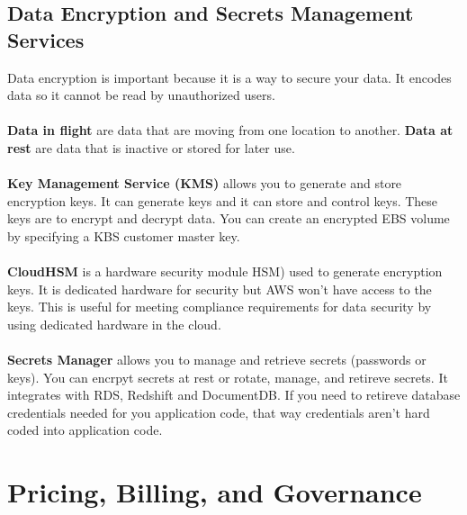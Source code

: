 \documentclass{article}%
\begin{document}
\subsection{Data Encryption and Secrets Management Services}
Data encryption is important because it is a way to secure your data. It encodes data so it cannot be read by unauthorized users. \\ \\
\textbf{Data in flight} are data that are moving from one location to another. 
\textbf{Data at rest} are data that is inactive or stored for later use. \\ \\
\textbf{Key Management Service (KMS)} allows you to generate and store encryption keys. It can generate keys and it can store and control keys. These keys are to encrypt and decrypt data. You can create an encrypted EBS volume by specifying a KBS customer master key. \\ \\
\textbf{CloudHSM} is a hardware security module HSM) used to generate encryption keys. It is dedicated hardware for security but AWS won't have access to the keys. This is useful for meeting compliance requirements for data security by using dedicated hardware in the cloud. \\ \\
\textbf{Secrets Manager} allows you to manage and retrieve secrets (passwords or keys). You can encrpyt secrets at rest or rotate, manage, and retireve secrets. It integrates with RDS, Redshift and DocumentDB. If you need to retireve database credentials needed for you application code, that way credentials aren't hard coded into application code.
\section{Pricing, Billing, and Governance}
\end{document}
